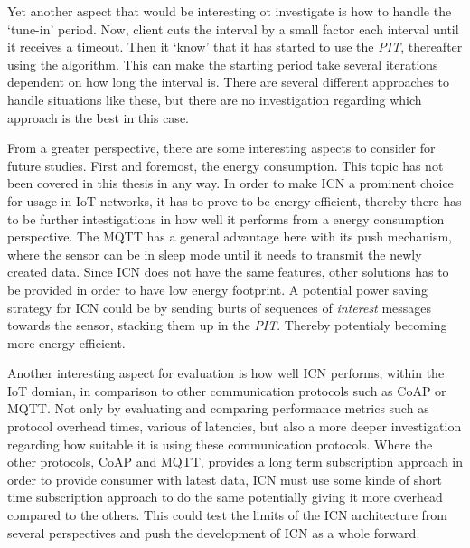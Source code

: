 Yet another aspect that would be interesting ot investigate is how to handle the `tune-in' period. Now, client cuts the interval by a small factor each interval until it receives a timeout. Then it `know' that it has started to use the \textit{PIT}, thereafter using the algorithm. This can make the starting period take several iterations dependent on how long the interval is. There are several different approaches to handle situations like these, but there are no investigation regarding which approach is the best in this case.

From a greater perspective, there are some interesting aspects to consider for future studies. First and foremost, the energy consumption. This topic has not been covered in this thesis in any way. In order to make ICN a prominent choice for usage in IoT networks, it has to prove to be energy efficient, thereby there has to be further intestigations in how well it performs from a energy consumption perspective. The MQTT has a general advantage here with its push mechanism, where the sensor can be in sleep mode until it needs to transmit the newly created data. Since ICN does not have the same features, other solutions has to be provided in order to have low energy footprint. A potential power saving strategy for ICN could be by sending burts of sequences of \textit{interest} messages towards the sensor, stacking them up in the \textit{PIT}. Thereby potentialy becoming more energy efficient. 

Another interesting aspect for evaluation is how well ICN performs, within the IoT domian, in comparison to other communication protocols such as CoAP or MQTT. Not only by evaluating and comparing performance metrics such as protocol overhead times, various of latencies, but also a more deeper investigation regarding how suitable it is using these communication protocols. Where the other protocols, CoAP and MQTT, provides a long term subscription approach in order to provide consumer with latest data, ICN must use some kinde of short time subscription approach to do the same potentially giving it more overhead compared to the others.
This could test the limits of the ICN architecture from several perspectives and push the development of ICN as a whole forward.


%
%



